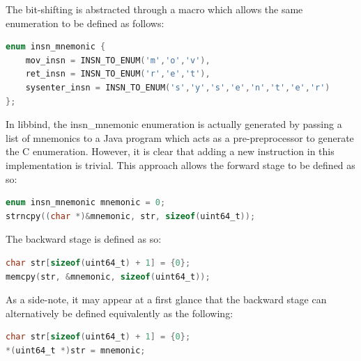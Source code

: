 The bit-shifting is abstracted through a macro which allows the same enumeration to be defined as follows:

\noindent\begin{minipage}{\textwidth}
\begin{lstlisting}[language=C,caption={Macro abstraction.}]
enum insn_mnemonic {
	mov_insn = INSN_TO_ENUM('m','o','v'),
	ret_insn = INSN_TO_ENUM('r','e','t'),
	sysenter_insn = INSN_TO_ENUM('s','y','s','e','n','t','e','r')
};
\end{lstlisting}
\end{minipage}

In libbind, the insn\_mnemonic enumeration is actually generated by passing a list of mnemonics to a Java program which acts as a pre-preprocessor to generate the C enumeration. However, it is clear that adding a new instruction in this implementation is trivial. This approach allows the forward stage to be defined as so:

\noindent\begin{minipage}{\textwidth}
\begin{lstlisting}[language=C,caption={Forward stage.}]
enum insn_mnemonic mnemonic = 0;
strncpy((char *)&mnemonic, str, sizeof(uint64_t));
\end{lstlisting}
\end{minipage}

The backward stage is defined as so:

\noindent\begin{minipage}{\textwidth}
\begin{lstlisting}[language=C,caption={Backward stage (mnemonic is of type \emph{enum insn\_mnemonic}). The extra byte in the char array is used as padding for the null terminator.}]
char str[sizeof(uint64_t) + 1] = {0};
memcpy(str, &mnemonic, sizeof(uint64_t));
\end{lstlisting}
\end{minipage}

As a side-note, it may appear at a first glance that the backward stage can alternatively be defined equivalently as the following:

\noindent\begin{minipage}{\textwidth}
\begin{lstlisting}[language=C,caption={mnemonic is of type \emph{enum insn\_mnemonic}. The array str is casted to a pointer to a uint64\_t and assigned the value of mnemonic.}]
char str[sizeof(uint64_t) + 1] = {0};
*(uint64_t *)str = mnemonic;
\end{lstlisting}
\end{minipage}

